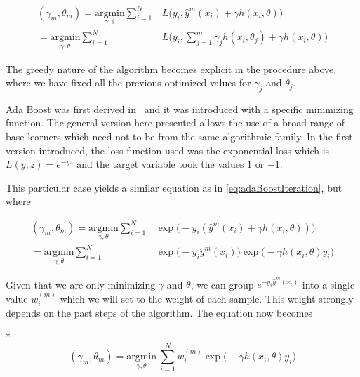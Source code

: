 \begin{equation}\label{eq:adaBoostIteration}
\begin{split}
(\gamma_{m}, \theta_{m}) = \underset{\gamma, \theta}{\mathrm{argmin}} \sum_{i=1}^{N} & L\big( y_i,  \hat{y}^{m}(x_i) + \gamma h(x_i,\theta) \big) \\
= \underset{\gamma, \theta}{\mathrm{argmin}} \sum_{i=1}^{N} & L\big( y_i,  \sum_{j=1}^{m} \gamma_j h(x_i,\theta_j) + \gamma h(x_i,\theta) \big)
\end{split}
\end{equation}

The greedy nature of the algorithm becomes explicit in the procedure above, where we have fixed all the previous optimized values for $\gamma_j$ and $\theta_j$.

Ada Boost was first derived in~\cite{schapire-adaBoost} and it was introduced with a specific minimizing function.
The general version here presented allows the use of a broad range of base learners which need not to be from the same algorithmic family.
In the first version introduced, the loss function used was the exponential loss which is $L(y,z) = e^{-yz}$ and the target variable took the values $1$ or $-1$.

This particular case yields a similar equation as in \cref{eq:adaBoostIteration}, but where

\begin{equation}\label{eq:sadaBoostExponentialIteration}
\begin{split}
(\gamma_{m}, \theta_{m}) = \underset{\gamma, \theta}{\mathrm{argmin}} \sum_{i=1}^{N} & \exp\big( -y_i (\hat{y}^{m}(x_i) + \gamma h(x_i,\theta) )\big) \\
= \underset{\gamma, \theta}{\mathrm{argmin}} \sum_{i=1}^{N} &
\exp\big( -y_i \hat{y}^{m}(x_i)\big) \exp\big(- \gamma h(x_i,\theta)y_i \big)
\end{split}
\end{equation}


Given that we are only minimizing $\gamma$ and $\theta$, we can group $e^{-y_i \hat{y}^{m}(x_i)}$ into a single value $w_i^{(m)}$ which we will set to the weight of each sample.
This weight strongly depends on the past steps of the algorithm.
The equation now becomes

*
\begin{equation}\label{eq:adaBoostExponentialIteration2}
(\gamma_{m}, \theta_{m}) = \underset{\gamma, \theta}{\mathrm{argmin}} \  \sum_{i=1}^{N} w_i^{(m)} \exp \big(-\gamma h(x_i,\theta)y_i \big)
\end{equation}

